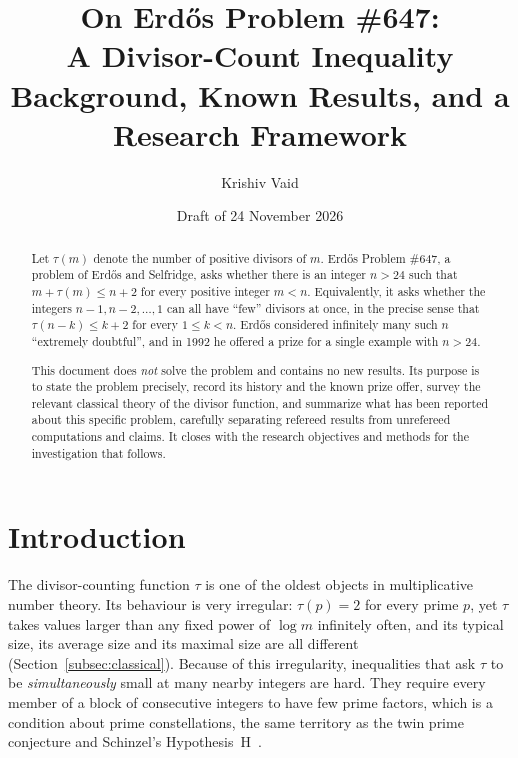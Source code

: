 \documentclass[11pt]{amsart}
\title[On Erd\H{o}s Problem \#647]{On Erd\H{o}s Problem \#647:\\ A Divisor-Count Inequality\\[0.5ex]
  {\normalfont\small Background, Known Results, and a Research Framework}}
\author{Krishiv Vaid}
\date{Draft of 24 November 2026}
\theoremstyle{plain}
\theoremstyle{definition}
\theoremstyle{remark}
\numberwithin{equation}{section}
\begin{document}
\begin{abstract}
Let $\tau(m)$ denote the number of positive divisors of $m$. Erd\H{o}s Problem \#647, a problem of Erd\H{o}s and Selfridge, asks whether there is an integer $n>24$ such that $m+\tau(m)\le n+2$ for every positive integer $m<n$. Equivalently, it asks whether the integers $n-1, n-2, \dots, 1$ can all have ``few'' divisors at once, in the precise sense that $\tau(n-k)\le k+2$ for every $1\le k<n$. Erd\H{o}s considered infinitely many such $n$ ``extremely doubtful'', and in 1992 he offered a prize for a single example with $n>24$.

This document does \emph{not} solve the problem and contains no new results. Its purpose is to state the problem precisely, record its history and the known prize offer, survey the relevant classical theory of the divisor function, and summarize what has been reported about this specific problem, carefully separating refereed results from unrefereed computations and claims. It closes with the research objectives and methods for the investigation that follows.
\end{abstract}

\maketitle

\noindent{}

\tableofcontents

\section{Introduction}\label{sec:intro}

The divisor-counting function $\tau$ is one of the oldest objects in multiplicative number theory. Its behaviour is very irregular: $\tau(p)=2$ for every prime $p$, yet $\tau$ takes values larger than any fixed power of $\log m$ infinitely often, and its typical size, its average size and its maximal size are all different (Section~\ref{subsec:classical}). Because of this irregularity, inequalities that ask $\tau$ to be \emph{simultaneously} small at many nearby integers are hard. They require every member of a block of consecutive integers to have few prime factors, which is a condition about prime constellations, the same territory as the twin prime conjecture and Schinzel's Hypothesis~H~\cite{SchinzelSierpinski1958}.
\end{document}
